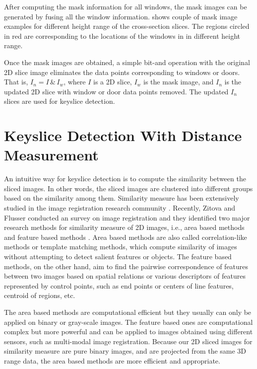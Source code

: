 After computing the mask information for all windows,
the mask images can be generated by fusing all the window information.
 shows couple of mask image examples
for different height range of the cross-section slices.
The regions circled in red are corresponding to
the locations of the windows in  in different height range.

Once the mask images are obtained,
a simple bit-and operation with the original 2D slice image
eliminates the data points corresponding to windows or doors.
That is, $I_n = I \, \& \, I_w$, where $I$ is a 2D slice, $I_w$ is the mask image,
and $I_n$ is the updated 2D slice with window or door data points removed.
The updated $I_n$ slices are used for keyslice detection.

\section{Keyslice Detection With Distance Measurement}
\label{sec:ksd}

An intuitive way for keyslice detection is to
compute the similarity between the sliced images.
In other words, the sliced images are clustered into different groups
based on the similarity among them.
Similarity measure has been extensively studied in the image registration
research community \cite{IR_Brown, RE_WWLZ}.
Recently, Zitova and Flusser conducted an survey on
image registration and they identified two major research methods
for similarity measure of 2D images, i.e.,
area based methods and feature based methods \cite{IR_ZF}.
Area based methods are also called correlation-like methods or
template matching methods, which compute similarity of images
without attempting to detect salient features or objects.
The feature based methods, on the other hand, aim to find
the pairwise correspondence of features between two images based on
spatial relations or various descriptors of features represented
by control points, such as end points or centers of line features,
centroid of regions, etc.

The area based methods are computational efficient
but they usually can only be applied on binary or gray-scale images.
The feature based ones are computational complex but more powerful
and can be applied to images obtained using different sensors,
such as multi-modal image registration.
Because our 2D sliced images for similarity measure are pure binary images,
and are projected from the same 3D range data,
the area based methods are more efficient and appropriate.

